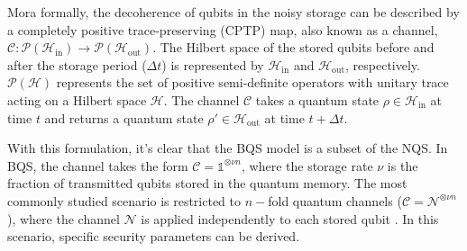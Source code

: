 Mora formally, the decoherence of qubits in the noisy storage can be described by a completely positive trace-preserving (CPTP) map, also known as a channel, $\mathcal{C}: \mathcal{P}(\mathcal{H}_{\text{in}})\rightarrow \mathcal{P}(\mathcal{H}_{\text{out}})$. The Hilbert space of the stored qubits before and after the storage period ($\Delta t$) is represented by $\mathcal{H}_{\text{in}}$ and $\mathcal{H}_{\text{out}}$, respectively. $\mathcal{P}(\mathcal{H})$ represents the set of positive semi-definite operators with unitary trace acting on a Hilbert space $\mathcal{H}$. The channel $\mathcal{C}$ takes a quantum state $\rho\in\mathcal{H}_{\text{in}}$ at time $t$ and returns a quantum state $\rho'\in\mathcal{H}_{\text{out}}$ at time $t + \Delta t$. %

With this formulation, it's clear that the BQS model is a subset of the NQS. In BQS, the channel takes the form $\mathcal{C} = \mathds{1}^{\otimes \nu n}$, where the storage rate $\nu$ is the fraction of transmitted qubits stored in the quantum memory. The most commonly studied scenario is restricted to $n-$fold quantum channels ($\mathcal{C} = \mathcal{N}^{\otimes \nu n}$), where the channel $\mathcal{N}$ is applied independently to each stored qubit \cite{S10, KWW12, WST08}. In this scenario, specific security parameters can be derived.


\

